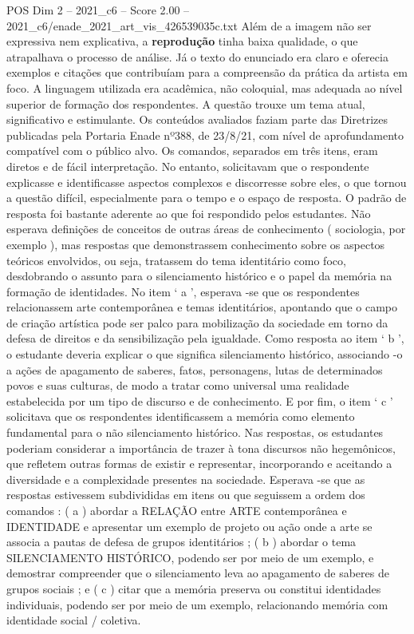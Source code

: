 \begin{textsample}{POS Dim 2 – 2021\_c6 – Score 2.00 – 2021\_c6/enade\_2021\_art\_vis\_426539035c.txt}
Além de a imagem não ser expressiva nem explicativa, a \textbf{reprodução} tinha baixa qualidade, o que atrapalhava o processo de análise.
Já o texto do enunciado era claro e oferecia exemplos e citações que contribuíam para a compreensão da prática da artista em foco.
A linguagem utilizada era acadêmica, não coloquial, mas adequada ao nível superior de formação dos respondentes.
A questão trouxe um tema atual, significativo e estimulante.
Os conteúdos avaliados faziam parte das Diretrizes publicadas pela Portaria Enade nº388, de 23/8/21, com nível de aprofundamento compatível com o público alvo.
Os comandos, separados em três itens, eram diretos e de fácil interpretação.
No entanto, solicitavam que o respondente explicasse e identificasse aspectos complexos e discorresse sobre eles, o que tornou a questão difícil, especialmente para o tempo e o espaço de resposta.
O padrão de resposta foi bastante aderente ao que foi respondido pelos estudantes.
Não esperava definições de conceitos de outras áreas de conhecimento ( sociologia, por exemplo ), mas respostas que demonstrassem conhecimento sobre os aspectos teóricos envolvidos, ou seja, tratassem do tema identitário como foco, desdobrando o assunto para o silenciamento histórico e o papel da memória na formação de identidades.
No item ‘ a ’, esperava -se que os respondentes relacionassem arte contemporânea e temas identitários, apontando que o campo de criação artística pode ser palco para mobilização da sociedade em torno da defesa de direitos e da sensibilização pela igualdade.
Como resposta ao item ‘ b ’, o estudante deveria explicar o que significa silenciamento histórico, associando -o a ações de apagamento de saberes, fatos, personagens, lutas de determinados povos e suas culturas, de modo a tratar como universal uma realidade estabelecida por um tipo de discurso e de conhecimento.
E por fim, o item ‘ c ’ solicitava que os respondentes identificassem a memória como elemento fundamental para o não silenciamento histórico.
Nas respostas, os estudantes poderiam considerar a importância de trazer à tona discursos não hegemônicos, que refletem outras formas de existir e representar, incorporando e aceitando a diversidade e a complexidade presentes na sociedade.
Esperava -se que as respostas estivessem subdivididas em itens ou que seguissem a ordem dos comandos : ( a ) abordar a RELAÇÃO entre ARTE contemporânea e IDENTIDADE e apresentar um exemplo de projeto ou ação onde a arte se associa a pautas de defesa de grupos identitários ; ( b ) abordar o tema SILENCIAMENTO HISTÓRICO, podendo ser por meio de um exemplo, e demostrar compreender que o silenciamento leva ao apagamento de saberes de grupos sociais ; e ( c ) citar que a memória preserva ou constitui identidades individuais, podendo ser por meio de um exemplo, relacionando memória com identidade social / coletiva.

\end{textsample}

